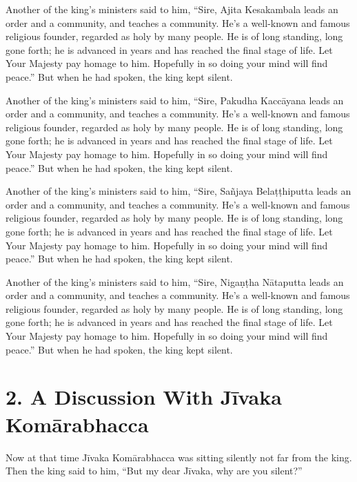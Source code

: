 \documentclass[12pt,openany]{book}%
\begin{document}
Another of the king’s ministers said to him, “Sire, Ajita Kesakambala leads an order and a community, and teaches a community. He’s a well-known and famous religious founder, regarded as holy by many people. He is of long standing, long gone forth; he is advanced in years and has reached the final stage of life. Let Your Majesty pay homage to him. Hopefully in so doing your mind will find peace.” But when he had spoken, the king kept silent. 

Another of the king’s ministers said to him, “Sire, Pakudha \textsanskrit{Kaccāyana} leads an order and a community, and teaches a community. He’s a well-known and famous religious founder, regarded as holy by many people. He is of long standing, long gone forth; he is advanced in years and has reached the final stage of life. Let Your Majesty pay homage to him. Hopefully in so doing your mind will find peace.” But when he had spoken, the king kept silent. 

Another of the king’s ministers said to him, “Sire, \textsanskrit{Sañjaya} \textsanskrit{Belaṭṭhiputta} leads an order and a community, and teaches a community. He’s a well-known and famous religious founder, regarded as holy by many people. He is of long standing, long gone forth; he is advanced in years and has reached the final stage of life. Let Your Majesty pay homage to him. Hopefully in so doing your mind will find peace.” But when he had spoken, the king kept silent. 

Another of the king’s ministers said to him, “Sire, \textsanskrit{Nigaṇṭha} \textsanskrit{Nātaputta} leads an order and a community, and teaches a community. He’s a well-known and famous religious founder, regarded as holy by many people. He is of long standing, long gone forth; he is advanced in years and has reached the final stage of life. Let Your Majesty pay homage to him. Hopefully in so doing your mind will find peace.” But when he had spoken, the king kept silent. 

\section*{2. A Discussion With \textsanskrit{Jīvaka} \textsanskrit{Komārabhacca} }

Now at that time \textsanskrit{Jīvaka} \textsanskrit{Komārabhacca} was sitting silently not far from the king. Then the king said to him, “But my dear \textsanskrit{Jīvaka}, why are you silent?” 
\end{document}
